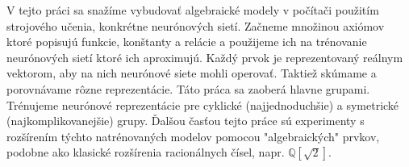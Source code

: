 \documentclass[12pt]{article}
\begin{document}
V tejto práci sa snažíme vybudovať algebraické modely v počítači použitím strojového učenia, konkrétne neurónových sietí. Začneme množinou axiómov ktoré popisujú funkcie, konštanty a relácie a použijeme ich na trénovanie neurónových sietí ktoré ich aproximujú. Každý prvok je reprezentovaný reálnym vektorom, aby na nich neurónové siete mohli operovať. Taktiež skúmame a porovnávame rôzne reprezentácie. Táto práca sa zaoberá hlavne grupami. Trénujeme neurónové reprezentácie pre cyklické (najjednoduchšie) a symetrické (najkomplikovanejšie) grupy. Ďalšou časťou tejto práce sú experimenty s rozšírením týchto natrénovaných modelov pomocou "algebraických" prvkov, podobne ako klasické rozšírenia racionálnych čísel, napr. $\mathbb{Q}[\sqrt{2}]$. 
\end{document}
